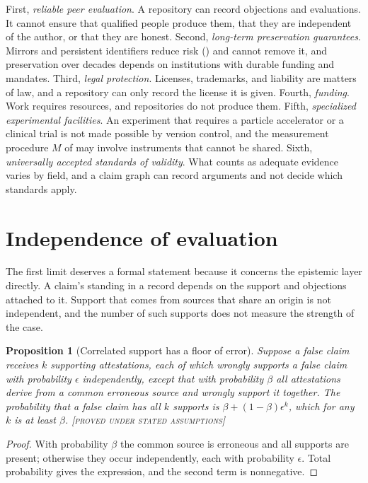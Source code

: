 \documentclass[11pt,twoside,openright]{book}
\theoremstyle{plain}
\newtheorem{proposition}[theorem]{Proposition}
\theoremstyle{definition}
\theoremstyle{remark}
\newcommand{\Proved}{\textup{\textsc{[proved under stated assumptions]}}}
\begin{document}
First, \emph{reliable peer evaluation}. A repository can record objections and evaluations. It cannot ensure that qualified people produce them, that they are independent of the author, or that they are honest. Second, \emph{long-term preservation guarantees}. Mirrors and persistent identifiers reduce risk () and cannot remove it, and preservation over decades depends on institutions with durable funding and mandates. Third, \emph{legal protection}. Licenses, trademarks, and liability are matters of law, and a repository can only record the license it is given. Fourth, \emph{funding}. Work requires resources, and repositories do not produce them. Fifth, \emph{specialized experimental facilities}. An experiment that requires a particle accelerator or a clinical trial is not made possible by version control, and the measurement procedure $M$ of  may involve instruments that cannot be shared. Sixth, \emph{universally accepted standards of validity}. What counts as adequate evidence varies by field, and a claim graph can record arguments and not decide which standards apply.

\section{Independence of evaluation}

The first limit deserves a formal statement because it concerns the epistemic layer directly. A claim's standing in a record depends on the support and objections attached to it. Support that comes from sources that share an origin is not independent, and the number of such supports does not measure the strength of the case.

\begin{proposition}[Correlated support has a floor of error]\label{prop:corrsupport}
Suppose a false claim receives $k$ supporting attestations, each of which wrongly supports a false claim with probability $\epsilon$ independently, except that with probability $\beta$ all attestations derive from a common erroneous source and wrongly support it together. The probability that a false claim has all $k$ supports is $\beta+(1-\beta)\epsilon^k$, which for any $k$ is at least $\beta$.
\Proved{}
\end{proposition}

\begin{proof}
With probability $\beta$ the common source is erroneous and all supports are present; otherwise they occur independently, each with probability $\epsilon$. Total probability gives the expression, and the second term is nonnegative.
\end{proof}
\end{document}
